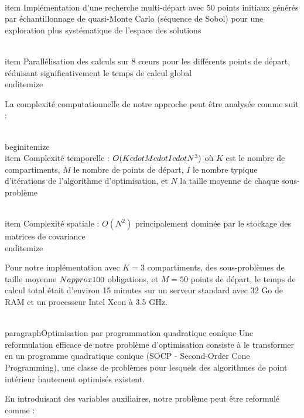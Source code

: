     \\item Implémentation d'une recherche multi-départ avec 50 points initiaux générés par échantillonnage de quasi-Monte Carlo (séquence de Sobol) pour une exploration plus systématique de l'espace des solutions
    
    \\item Parallélisation des calculs sur 8 cœurs pour les différents points de départ, réduisant significativement le temps de calcul global
\\end{itemize}

La complexité computationnelle de notre approche peut être analysée comme suit :

\\begin{itemize}
    \\item Complexité temporelle : $O(K \\cdot M \\cdot I \\cdot N^3)$ où $K$ est le nombre de compartiments, $M$ le nombre de points de départ, $I$ le nombre typique d'itérations de l'algorithme d'optimisation, et $N$ la taille moyenne de chaque sous-problème
    
    \\item Complexité spatiale : $O(N^2)$ principalement dominée par le stockage des matrices de covariance
\\end{itemize}

Pour notre implémentation avec $K=3$ compartiments, des sous-problèmes de taille moyenne $N \\approx 100$ obligations, et $M=50$ points de départ, le temps de calcul total était d'environ 15 minutes sur un serveur standard avec 32 Go de RAM et un processeur Intel Xeon à 3.5 GHz.

\\paragraph{Optimisation par programmation quadratique conique}
Une reformulation efficace de notre problème d'optimisation consiste à le transformer en un programme quadratique conique (SOCP - Second-Order Cone Programming), une classe de problèmes pour lesquels des algorithmes de point intérieur hautement optimisés existent.

En introduisant des variables auxiliaires, notre problème peut être reformulé comme :

